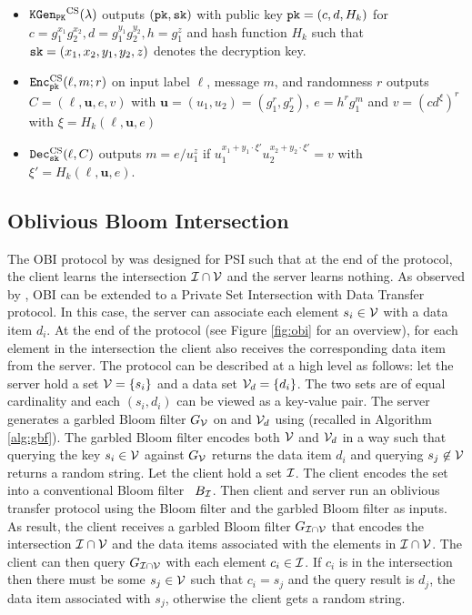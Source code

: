 \begin{itemize}
  \item $\mathtt{KGen_{PK}}^\mathrm{CS}(\lambda)$ outputs $(\mathtt{pk}, \mathtt{sk})$ with public key $\mathtt{pk}=(c,d,H_k)$ for $c=g_{1}^{x_1}g_{2}^{x_2}, d=g_{1}^{y_1}g_{2}^{y_2}, h=g_{1}^z$ and hash function $H_k$ such that $\mathtt{sk}=(x_1,x_2,y_1,y_2,z)$ denotes the decryption key.
  \item $\mathtt{Enc}^{\mathrm{CS}}_\mathtt{pk}(\ell,m;r)$ on input label $\ell$, message $m$, and randomness $r$ outputs $C=(\ell,\bm{u},e,v)$ with $\bm{u}=(u_1,u_2)=(g_{1}^r,g_{2}^r),~ e=h^rg_1^m$ and $v=(cd^{\xi})^r$ with $\xi=H_k(\ell,\bm{u},e)$
  \item $\mathtt{Dec}_\mathtt{sk}^\mathrm{CS}(\ell,C)$ outputs $m=e/u_1^z$ if $u_1^{x_1+y_1\cdot \xi'}u_2^{x_2+y_2\cdot \xi'}=v$ with $\xi'=H_k(\ell,\bm{u},e)$.
\end{itemize}

\subsection{Oblivious Bloom Intersection}\label{sec:obi}
The \ac{OBI} protocol by \citet{DongCW13} was designed for \ac{PSI} such that at the end of the protocol, the client learns the intersection $\mathcal{I}\cap \mathcal{V}$ and the server learns nothing. 
As observed by \citet{WenD14}, \ac{OBI} can be extended to a Private Set Intersection with Data Transfer protocol. 
In this case, the server can associate each element $s_i\in\mathcal{V}$ with a data item $d_i$. 
At the end of the protocol (see Figure \ref{fig:obi} for an overview), for each element in the intersection the client also receives the corresponding data item from the server. 
The protocol can be described at a high level as follows: let the server hold a set $\mathcal{V}=\{s_i\}$ and a data set $\mathcal{V}_d=\{d_{i}\}$. The two sets are of equal cardinality and each $(s_i,d_i)$ can be viewed as a key-value pair. 
The server generates a garbled Bloom filter $G_\mathcal{V}$ on \ServerSet and $\mathcal{V}_d$ using \citet[Algorithm 1]{WenD14} (recalled in Algorithm \ref{alg:gbf}). 
The garbled Bloom filter encodes both $\mathcal{V}$ and $\mathcal{V}_d$ in a way such that querying the key $s_i\in\mathcal{V}$ against $G_\mathcal{V}$ returns the data item $d_i$ and querying $s_j\not \in \mathcal{V}$ returns a random string. 
Let the client hold a set $\mathcal{I}$. 
The client encodes the set into a conventional Bloom filter~\cite{blo70} $B_\mathcal{I}$. 
Then client and server run an oblivious transfer protocol using the Bloom filter and the garbled Bloom filter as inputs. 
As result, the client receives a garbled Bloom filter $G_{\mathcal{I}\cap\mathcal{V}}$ that encodes the intersection $\mathcal{I}\cap \mathcal{V}$ and the data items associated with the elements in $\mathcal{I}\cap \mathcal{V}$. 
The client can then query $G_{\mathcal{I}\cap\mathcal{V}}$ with each element $c_i\in\mathcal{I}$. If $c_i$ is in the intersection then there must be  some $s_j\in \mathcal{V}$ such that $c_i=s_j$ and the query result is $d_j$, the data item associated with $s_j$, otherwise the client gets a random string. 

